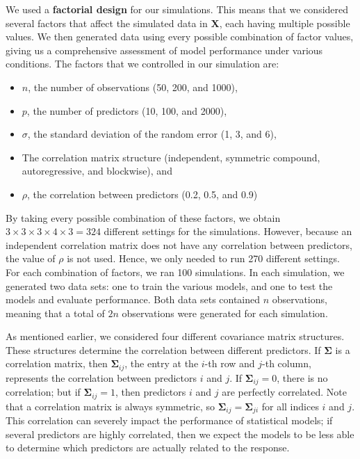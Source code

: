 \documentclass{article}
\begin{document}
We used a \textbf{factorial design} for our simulations. This means that we considered several factors that affect the simulated data in $\mathbf{X}$, each having multiple possible values. We then generated data using every possible combination of factor values, giving us a comprehensive assessment of model performance under various conditions. The factors that we controlled in our simulation are:
\begin{itemize}
	\item $n$, the number of observations (50, 200, and 1000),
	\item $p$, the number of predictors (10, 100, and 2000),
	\item $\sigma$, the standard deviation of the random error (1, 3, and 6),
	\item The correlation matrix structure (independent, symmetric compound, autoregressive, and blockwise), and
	\item $\rho$, the correlation between predictors (0.2, 0.5, and 0.9)
\end{itemize}

By taking every possible combination of these factors, we obtain $3\times 3\times 3\times 4\times 3 = 324$ different settings for the simulations. However, because an independent correlation matrix does not have any correlation between predictors, the value of $\rho$ is not used. Hence, we only needed to run 270 different settings. For each combination of factors, we ran 100 simulations. In each simulation, we generated two data sets: one to train the various models, and one to test the models and evaluate performance. Both data sets contained $n$ observations, meaning that a total of $2n$ observations were generated for each simulation.

As mentioned earlier, we considered four different covariance matrix structures. These structures determine the correlation between different predictors. If $\mathbf{\Sigma}$ is a correlation matrix, then $\mathbf{\Sigma}_{ij}$, the entry at the $i$-th row and $j$-th column, represents the correlation between predictors $i$ and $j$. If $\mathbf{\Sigma}_{ij}=0$, there is no correlation; but if $\mathbf{\Sigma}_{ij}=1$, then predictors $i$ and $j$ are perfectly correlated. Note that a correlation matrix is always symmetric, so $\mathbf{\Sigma}_{ij} = \mathbf{\Sigma}_{ji}$ for all indices $i$ and $j$. This correlation can severely impact the performance of statistical models; if several predictors are highly correlated, then we expect the models to be less able to determine which predictors are actually related to the response.
\end{document}
